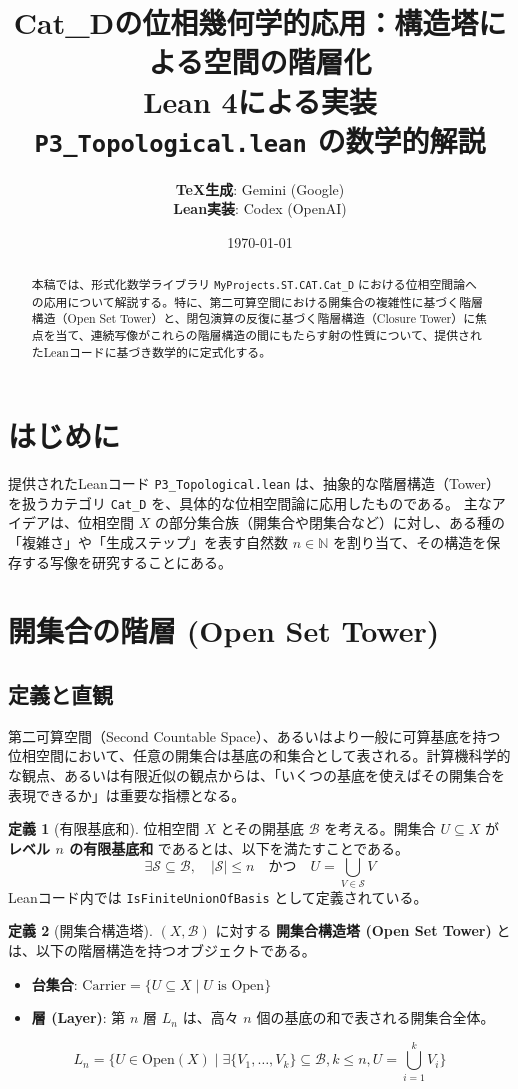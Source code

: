 \documentclass{ltjsarticle}
\title{\textbf{Cat\_Dの位相幾何学的応用：構造塔による空間の階層化}\\
\large Lean 4による実装 \texttt{P3\_Topological.lean} の数学的解説}
\author{
    \textbf{TeX生成}: Gemini (Google) \\
    \textbf{Lean実装}: Codex (OpenAI)
}
\date{\today}
\theoremstyle{definition}
\newtheorem{definition}{定義}[section]
\theoremstyle{plain}
\begin{document}
\maketitle

\begin{abstract}
本稿では、形式化数学ライブラリ \texttt{MyProjects.ST.CAT.Cat\_D} における位相空間論への応用について解説する。特に、第二可算空間における開集合の複雑性に基づく階層構造（Open Set Tower）と、閉包演算の反復に基づく階層構造（Closure Tower）に焦点を当て、連続写像がこれらの階層構造の間にもたらす射の性質について、提供されたLeanコードに基づき数学的に定式化する。
\end{abstract}

\tableofcontents

\section{はじめに}
提供されたLeanコード \texttt{P3\_Topological.lean} は、抽象的な階層構造（Tower）を扱うカテゴリ \texttt{Cat\_D} を、具体的な位相空間論に応用したものである。
主なアイデアは、位相空間 $X$ の部分集合族（開集合や閉集合など）に対し、ある種の「複雑さ」や「生成ステップ」を表す自然数 $n \in \mathbb{N}$ を割り当て、その構造を保存する写像を研究することにある。

\section{開集合の階層 (Open Set Tower)}

\subsection{定義と直観}
第二可算空間（Second Countable Space）、あるいはより一般に可算基底を持つ位相空間において、任意の開集合は基底の和集合として表される。計算機科学的な観点、あるいは有限近似の観点からは、「いくつの基底を使えばその開集合を表現できるか」は重要な指標となる。

\begin{definition}[有限基底和]
位相空間 $X$ とその開基底 $\mathcal{B}$ を考える。開集合 $U \subseteq X$ が \textbf{レベル $n$ の有限基底和} であるとは、以下を満たすことである。
\[
\exists \mathcal{S} \subseteq \mathcal{B}, \quad |\mathcal{S}| \le n \quad \text{かつ} \quad U = \bigcup_{V \in \mathcal{S}} V
\]
Leanコード内では \texttt{IsFiniteUnionOfBasis} として定義されている。
\end{definition}

\begin{definition}[開集合構造塔]
$(X, \mathcal{B})$ に対する \textbf{開集合構造塔 (Open Set Tower)} とは、以下の階層構造を持つオブジェクトである。
\begin{itemize}
    \item \textbf{台集合}: $\text{Carrier} = \{ U \subseteq X \mid U \text{ is Open} \}$
    \item \textbf{層 (Layer)}: 第 $n$ 層 $L_n$ は、高々 $n$ 個の基底の和で表される開集合全体。
\end{itemize}
\[
L_n = \{ U \in \text{Open}(X) \mid \exists \{V_1, \dots, V_k\} \subseteq \mathcal{B}, k \le n, U = \bigcup_{i=1}^k V_i \}
\]
\end{definition}
\end{document}
